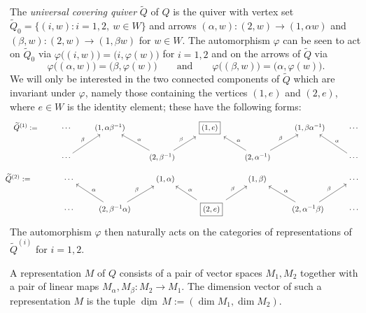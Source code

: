 \documentclass{amsart}
\numberwithin{equation}{section}
\newcommand{\udim}{\underline{\dim}\,}
\begin{document}
  The \emph{universal covering quiver} $\widetilde Q$ of $Q$ is the quiver with vertex set $\widetilde Q_0=\{(i,w):i=1,2,\ w\in W\}$ and arrows $(\alpha,w):(2,w)\to(1,\alpha w)$ and $(\beta,w):(2,w)\to(1,\beta w)$ for $w\in W$.
  The automorphism $\varphi$ can be seen to act on $\widetilde Q_0$ via $\varphi\big((i,w)\big)=\big(i,\varphi(w)\big)$ for $i=1,2$ and on the arrows of $\widetilde Q$ via
  \[\varphi\big((\alpha,w)\big)=\big(\beta,\varphi(w)\big) \qquad \text{and} \qquad \varphi\big((\beta,w)\big)=\big(\alpha,\varphi(w)\big).\]
  We will only be interested in the two connected components of $\widetilde Q$ which are invariant under $\varphi$, namely those containing the vertices $(1,e)$ and $(2,e)$, where $e\in W$ is the identity element; these have the following forms:
  \[
    \begin{tikzcd}
      \widetilde Q^{(1)} := & \cdots & (1,\alpha\beta^{-1}) & & \fbox{$(1,e)$} & & (1,\beta\alpha^{-1}) & \cdots \\
      & \cdots \arrow["\beta"]{ur} & & (2,\beta^{-1}) \arrow["\alpha"']{ul} \arrow["\beta"]{ur} & & (2,\alpha^{-1}) \arrow["\alpha"']{ul} \arrow["\beta"]{ur} & & \cdots \arrow["\alpha"']{ul}
    \end{tikzcd}
  \]
  \[
    \begin{tikzcd}
      \hspace{-0.37cm} \widetilde Q^{(2)} := \hspace{0.37cm} & \cdots & & (1,\alpha) & & (1,\beta) & & \cdots \\
      & \cdots & (2,\beta^{-1}\alpha) \arrow["\alpha"']{ul} \arrow["\beta"]{ur} & & \fbox{$(2,e)$} \arrow["\alpha"']{ul} \arrow["\beta"]{ur} & & (2,\alpha^{-1}\beta) \arrow["\alpha"']{ul} \arrow["\beta"]{ur} & \cdots
    \end{tikzcd}
  \]
  The automorphism $\varphi$ then naturally acts on the categories of representations of $\widetilde Q^{(i)}$ for $i=1,2$.

  A representation $M$ of $Q$ consists of a pair of vector spaces $M_1,M_2$ together with a pair of linear maps $M_\alpha,M_\beta:M_2\to M_1$.
  The dimension vector of such a representation $M$ is the tuple $\udim M:=(\dim M_1,\dim M_2)$.
\end{document}
